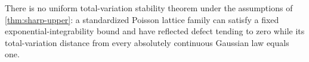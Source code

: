 \begin{proposition}\label{prop:tv}
There is no uniform total-variation stability theorem under the assumptions of \cref{thm:sharp-upper}: a standardized Poisson lattice family can satisfy a fixed exponential-integrability bound and have reflected defect tending to zero while its total-variation distance from every absolutely continuous Gaussian law equals one.
\end{proposition}
